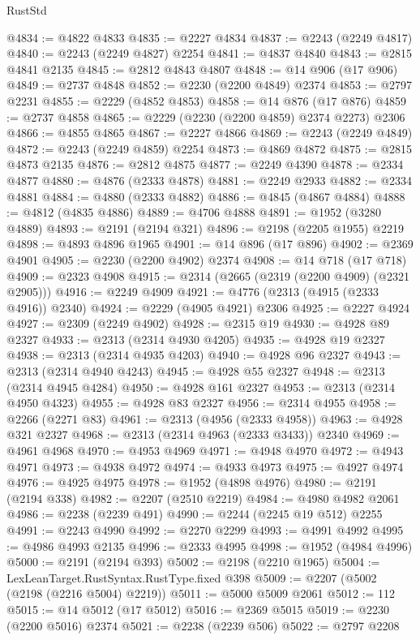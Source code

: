 \begin{lexlean}{RustStd}
\begin{coremodule}
@4834 := @4822 @4833
@4835 := @2227 @4834
@4837 := @2243 (@2249 @4817)
@4840 := @2243 (@2249 @4827) @2254
@4841 := @4837 @4840
@4843 := @2815 @4841 @2135
@4845 := @2812 @4843 @4807
@4848 := @14 @906 (@17 @906)
@4849 := @2737 @4848
@4852 := @2230 (@2200 @4849) @2374
@4853 := @2797 @2231
@4855 := @2229 (@4852 @4853)
@4858 := @14 @876 (@17 @876)
@4859 := @2737 @4858
@4865 := @2229 (@2230 (@2200 @4859) @2374 @2273) @2306
@4866 := @4855 @4865
@4867 := @2227 @4866
@4869 := @2243 (@2249 @4849)
@4872 := @2243 (@2249 @4859) @2254
@4873 := @4869 @4872
@4875 := @2815 @4873 @2135
@4876 := @2812 @4875
@4877 := @2249 @4390
@4878 := @2334 @4877
@4880 := @4876 (@2333 @4878)
@4881 := @2249 @2933
@4882 := @2334 @4881
@4884 := @4880 (@2333 @4882)
@4886 := @4845 (@4867 @4884)
@4888 := @4812 (@4835 @4886)
@4889 := @4706 @4888
@4891 := @1952 (@3280 @4889)
@4893 := @2191 (@2194 @321)
@4896 := @2198 (@2205 @1955) @2219
@4898 := @4893 @4896 @1965
@4901 := @14 @896 (@17 @896)
@4902 := @2369 @4901
@4905 := @2230 (@2200 @4902) @2374
@4908 := @14 @718 (@17 @718)
@4909 := @2323 @4908
@4915 := @2314 (@2665 (@2319 (@2200 @4909) (@2321 @2905)))
@4916 := @2249 @4909
@4921 := @4776 (@2313 (@4915 (@2333 @4916)) @2340)
@4924 := @2229 (@4905 @4921) @2306
@4925 := @2227 @4924
@4927 := @2309 (@2249 @4902)
@4928 := @2315 @19
@4930 := @4928 @89 @2327
@4933 := @2313 (@2314 @4930 @4205)
@4935 := @4928 @19 @2327
@4938 := @2313 (@2314 @4935 @4203)
@4940 := @4928 @96 @2327
@4943 := @2313 (@2314 @4940 @4243)
@4945 := @4928 @55 @2327
@4948 := @2313 (@2314 @4945 @4284)
@4950 := @4928 @161 @2327
@4953 := @2313 (@2314 @4950 @4323)
@4955 := @4928 @83 @2327
@4956 := @2314 @4955
@4958 := @2266 (@2271 @83)
@4961 := @2313 (@4956 (@2333 @4958))
@4963 := @4928 @321 @2327
@4968 := @2313 (@2314 @4963 (@2333 @3433)) @2340
@4969 := @4961 @4968
@4970 := @4953 @4969
@4971 := @4948 @4970
@4972 := @4943 @4971
@4973 := @4938 @4972
@4974 := @4933 @4973
@4975 := @4927 @4974
@4976 := @4925 @4975
@4978 := @1952 (@4898 @4976)
@4980 := @2191 (@2194 @338)
@4982 := @2207 (@2510 @2219)
@4984 := @4980 @4982 @2061
@4986 := @2238 (@2239 @491)
@4990 := @2244 (@2245 @19 @512) @2255
@4991 := @2243 @4990
@4992 := @2270 @2299
@4993 := @4991 @4992
@4995 := @4986 @4993 @2135
@4996 := @2333 @4995
@4998 := @1952 (@4984 @4996)
@5000 := @2191 (@2194 @393)
@5002 := @2198 (@2210 @1965)
@5004 := LexLeanTarget.RustSyntax.RustType.fixed @398
@5009 := @2207 (@5002 (@2198 (@2216 @5004) @2219))
@5011 := @5000 @5009 @2061
@5012 := 112
@5015 := @14 @5012 (@17 @5012)
@5016 := @2369 @5015
@5019 := @2230 (@2200 @5016) @2374
@5021 := @2238 (@2239 @506)
@5022 := @2797 @2208

\end{coremodule}
\end{lexlean}
